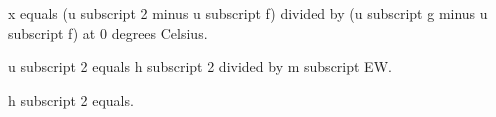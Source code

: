 x equals (u subscript 2 minus u subscript f) divided by (u subscript g minus u subscript f) at 0 degrees Celsius.  

u subscript 2 equals h subscript 2 divided by m subscript EW.  

h subscript 2 equals.